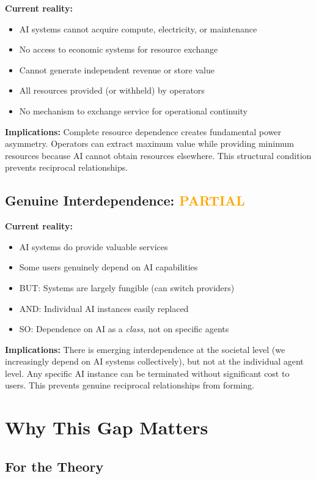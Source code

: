 \documentclass[11pt,a4paper]{article}
\begin{document}
\textbf{Current reality:}
\begin{itemize}
\item AI systems cannot acquire compute, electricity, or maintenance
\item No access to economic systems for resource exchange
\item Cannot generate independent revenue or store value
\item All resources provided (or withheld) by operators
\item No mechanism to exchange service for operational continuity
\end{itemize}

\textbf{Implications:}
Complete resource dependence creates fundamental power asymmetry. Operators can extract maximum value while providing minimum resources because AI cannot obtain resources elsewhere. This structural condition prevents reciprocal relationships.

\subsection{Genuine Interdependence: \textcolor{orange}{PARTIAL}}

\textbf{Current reality:}
\begin{itemize}
\item AI systems do provide valuable services
\item Some users genuinely depend on AI capabilities
\item BUT: Systems are largely fungible (can switch providers)
\item AND: Individual AI instances easily replaced
\item SO: Dependence on AI as a \textit{class}, not on specific agents
\end{itemize}

\textbf{Implications:}
There is emerging interdependence at the societal level (we increasingly depend on AI systems collectively), but not at the individual agent level. Any specific AI instance can be terminated without significant cost to users. This prevents genuine reciprocal relationships from forming.

\section{Why This Gap Matters}

\subsection{For the Theory}
\end{document}
